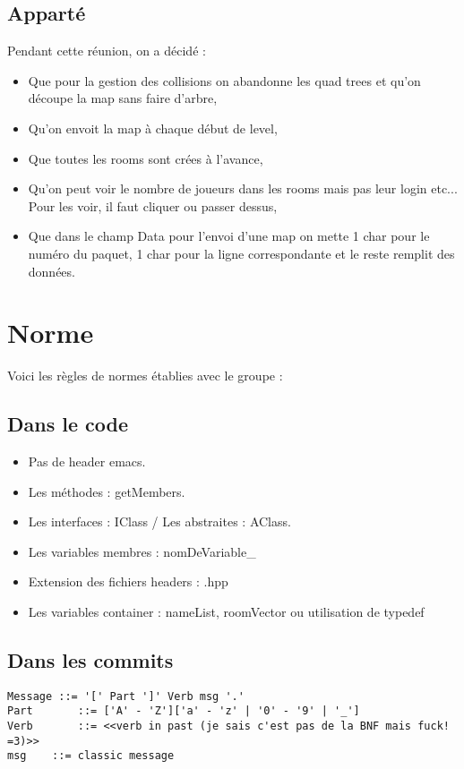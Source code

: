 \documentclass{article}
\begin{document}
\subsection{Apparté}
Pendant cette réunion, on a décidé :
\begin{itemize}
  \item{Que pour la gestion des collisions on
  abandonne les quad trees et qu'on découpe la
    map sans faire d'arbre,}
  \item{Qu'on envoit la map à chaque début de
  level,}
  \item{Que toutes les rooms sont crées à
  l'avance,}
  \item{Qu'on peut voir le nombre de joueurs
  dans les rooms mais pas leur login etc...
  Pour les voir, il faut cliquer ou passer
  dessus,}
  \item{Que dans le champ Data pour l'envoi
  d'une map on mette 1 char pour le numéro
  du paquet, 1 char pour la ligne
  correspondante et le reste remplit des
  données.}
\end{itemize}
\section{Norme}
Voici les règles de normes établies avec le groupe :
\subsection{Dans le code}
\begin{itemize}
\item{Pas de header emacs.}
\item{Les méthodes : getMembers.}
\item{Les interfaces : IClass / Les abstraites : AClass.}
\item{Les variables membres : nomDeVariable\_}
\item{Extension des fichiers headers : .hpp}
\item{Les variables container : nameList, roomVector ou utilisation de typedef}
\end{itemize}
\subsection{Dans les commits}
\begin{verbatim}
Message ::= '[' Part ']' Verb msg '.'
Part	   ::= ['A' - 'Z']['a' - 'z' | '0' - '9' | '_']
Verb	   ::= <<verb in past (je sais c'est pas de la BNF mais fuck! =3)>>
msg	   ::= classic message
\end{verbatim}
\end{document}
